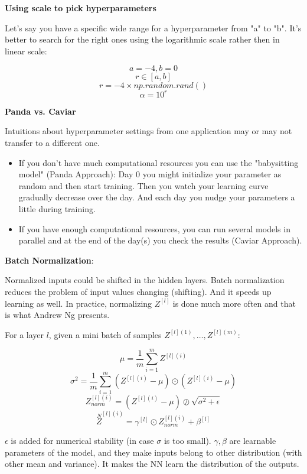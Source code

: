 \documentclass{article}
\begin{document}
\noindent \textbf{Using scale to pick hyperparameters}

\noindent Let's say you have a specific wide range for a hyperparameter from "a" to "b". It's better to search for the right ones using the logarithmic scale rather then in linear scale:

\[a = -4, b = 0\]
\[r \in [a, b]\]
\[r = -4 \times np.random.rand()\]
\[\alpha = 10^{r}\]

\noindent \textbf{Panda vs. Caviar}

\noindent Intuitions about hyperparameter settings from one application may or may not transfer to a different one.

\begin{itemize}
    \item If you don't have much computational resources you can use the "babysitting model" (Panda Approach): Day 0 you might initialize your parameter as random and then start training. Then you watch your learning curve gradually decrease over the day. And each day you nudge your parameters a little during training.
    \item If you have enough computational resources, you can run several models in parallel and at the end of the day(s) you check the results (Caviar Approach).
\end{itemize}

\noindent \textbf{Batch Normalization}:

\noindent \noindent Normalized inputs could be shifted in the hidden layers. Batch normalization reduces the problem of input values changing (shifting). And it speeds up learning as well. In practice, normalizing \(Z^{[l]}\) is done much more often and that is what Andrew Ng presents.

\bigskip

\noindent For a layer \(l\), given a mini batch of samples \(Z^{[l](1)}, \dots, Z^{[l](m)}\):

\[\mu = \frac{1}{m} \sum^{m}_{i = 1} Z^{[l](i)}\]
\[\sigma^{2} = \frac{1}{m} \sum^{m}_{i = 1} (Z^{[l](i)} - \mu) \odot (Z^{[l](i)} - \mu)\]
\[Z^{[l](i)}_{norm} = (Z^{[l](i)} - \mu) \oslash \sqrt{\sigma^{2} + \epsilon}\]
\[\overset{N}{Z}^{[l](i)} = \gamma^{[l]} \odot Z^{[l](i)}_{norm} + \beta^{[l]}\]

\noindent \(\epsilon\) is added for numerical stability (in case \(\sigma\) is too small). \(\gamma, \beta\) are learnable parameters of the model, and they make inputs belong to other distribution (with other mean and variance). It makes the NN learn the distribution of the outputs.
\end{document}
